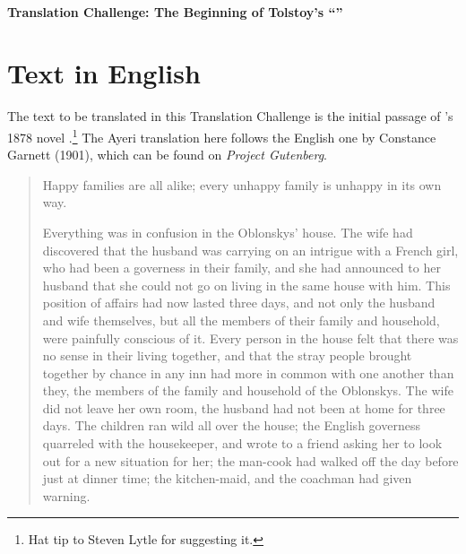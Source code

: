 \documentclass[12pt,paper=letter]{scrartcl}
\newcommand{\tit}[1]{\textit{#1}} %
\newcommand{\q}[1]{\enquote{#1}} %
\newenvironment{mytitle}{
    \begin{center}
	\Large
	\sffamily\bfseries
	~\\
}{
    \end{center}
}
\begin{document}

\begin{mytitle}
    Translation Challenge: The Beginning of Tolstoy's \q{}
\end{mytitle}

\section{Text in English}

The text to be translated in this Translation Challenge is the initial passage
of \citeauthor{tolstoy}'s 1878 novel .\footnote{Hat tip to 
Steven Lytle for suggesting it.} The Ayeri translation here follows the English 
one by Constance Garnett (1901), which can be found on \tit{Project Gutenberg}.

\blockcquote{tolstoy}{
\noindent Happy families are all alike; every unhappy family is unhappy in its 
own way.

Everything was in confusion in the Oblonskys’ house. The wife had discovered 
that the husband was carrying on an intrigue with a French girl, who had been a 
governess in their family, and she had announced to her husband that she could 
not go on living in the same house with him. This position of affairs had now 
lasted three days, and not only the husband and wife themselves, but all the 
members of their family and household, were painfully conscious of it. Every 
person in the house felt that there was no sense in their living together, and 
that the stray people brought together by chance in any inn had more in common 
with one another than they, the members of the family and household of the 
Oblonskys. The wife did not leave her own room, the husband had not been at 
home for three days. The children ran wild all over the house; the English 
governess quarreled with the housekeeper, and wrote to a friend asking her to 
look out for a new situation for her; the man-cook had walked off the day 
before just at dinner time; the kitchen-maid, and the coachman had given warning.
}
\end{document}
